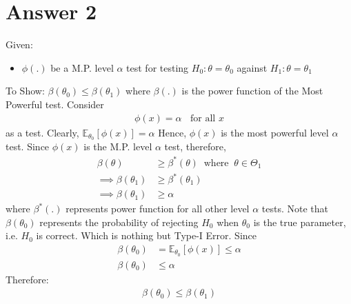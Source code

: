 \documentclass[a4paper]{article}
\begin{document}
\section{Answer 2}
Given:
\begin{itemize}
	\item {$\phi\left( . \right) $ be a M.P. level $\alpha$ test for testing $H_0 : \theta = \theta_0$ against $H_1 : \theta = \theta_1$}
\end{itemize}
To Show: $\beta\left( \theta_0 \right) \le \beta\left( \theta_1 \right) $ where $\beta\left( . \right) $ is the power function of the Most Powerful test.
\newline\newline
Consider
\begin{equation*}
	\begin{split}
		\phi\left( x \right) = \alpha \;\;\text{ for all $x$}
	\end{split}
\end{equation*}
as a test.
\newline\newline
Clearly, $\mathbb{E}_{\theta_0} \left[ \phi\left( x \right)  \right] = \alpha$
\newline\newline
Hence, $\phi\left( x \right) $ is the most powerful level $\alpha$ test.
Since $\phi\left( x \right) $ is the M.P. level $\alpha$ test, therefore,
\begin{equation*}
	\begin{split}
		\beta\left( \theta \right) &\ge \beta^{*}\left( \theta \right)\;\;\text{where}\;\; \theta \in \Theta_1\\
\implies \beta\left( \theta_1 \right) &\ge \beta^{*}\left( \theta_1 \right)\\
\implies \beta\left( \theta_1 \right) &\ge \alpha
	\end{split}
\end{equation*}
where $\beta^{*}\left( . \right) $ represents power function for all other level $\alpha$ tests.
\newline\newline
Note that $\beta\left( \theta_0 \right) $ represents the probability of rejecting $H_0$ when $\theta_0$ is the true parameter, i.e.  $H_0$ is correct. Which is nothing but Type-I Error.
\newline\newline
Since
\begin{equation*}
	\begin{split}
		\beta\left( \theta_0 \right) &= \mathbb{E}_{\theta_0}\left[ \phi\left( x \right)  \right] \le \alpha\\
		\beta\left( \theta_0 \right) &\le  \alpha
	\end{split}
\end{equation*}
Therefore:
\begin{equation*}
	\begin{split}
		\beta\left( \theta_0 \right) \le \beta\left( \theta_1\right) 
	\end{split}
\end{equation*}
\newpage
\end{document}

